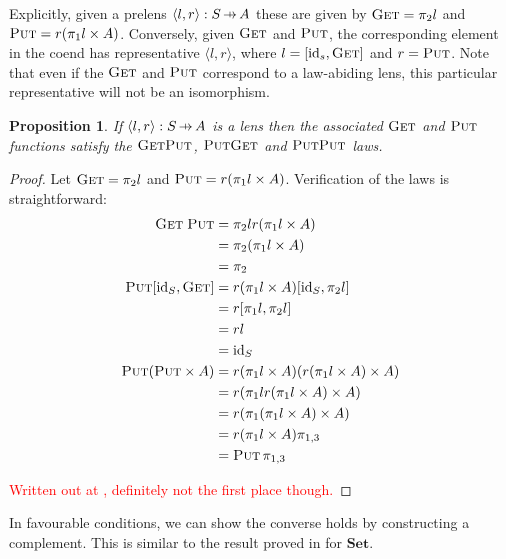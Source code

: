 \documentclass[11pt,a4paper]{article}
\theoremstyle{plain}
\newtheorem{proposition}[theorem]{Proposition}
\theoremstyle{definition}
\newcommand{\Set}{\mathbf{Set}}
\newcommand{\id}{\mathrm{id}}
\newcommand{\fget}{\textsc{Get}}
\newcommand{\fput}{\textsc{Put}}
\newcommand{\hto}{\ensuremath{\,\mathaccent\shortmid\rightarrow\,}}
\newcommand{\todo}[1]{\textcolor{red}{\small #1}}
\begin{document}
Explicitly, given a prelens $\langle l, r \rangle : S \hto A$ these are given by $\fget = \pi_2 l$ and $\fput = r (\pi_1 l \times A)$. Conversely, given $\fget$ and $\fput$, the corresponding element in the coend has representative $\langle l, r \rangle$, where $l = [\id_s, \fget]$ and $r = \fput$. Note that even if the $\fget$ and $\fput$ correspond to a law-abiding lens, this particular representative will not be an isomorphism.

\begin{proposition}
\label{prop-OpticImpliesLensLaws}
If $\langle l, r \rangle : S \hto A$ is a lens then the associated $\fget$ and $\fput$ functions satisfy the $\fget\fput$, $\fput\fget$ and $\fput\fput$ laws.
\end{proposition}
\begin{proof}
Let $\fget = \pi_2 l$ and $\fput = r (\pi_1 l \times A)$. Verification of the laws is straightforward:
\begin{align*}
\fget \; \fput 
&= \pi_2 l r (\pi_1 l \times A) \\
&= \pi_2 (\pi_1 l \times A) \\
&= \pi_2 \\
\fput [\id_S, \fget] 
&= r (\pi_1 l \times A) [\id_S, \pi_2 l] \\
&= r [\pi_1 l, \pi_2 l] \\
&= rl \\
&= \id_S \\
\fput (\fput \times A) 
&= r (\pi_1 l \times A) (r (\pi_1 l \times A) \times A) \\
&= r (\pi_1 l  r (\pi_1 l \times A) \times A) \\
&= r (\pi_1 (\pi_1 l \times A) \times A) \\
&= r (\pi_1 l \times A) \pi_{1,3} \\
&= \fput \, \pi_{1, 3}
\end{align*}

\todo{Written out at \cite{IsomorphismLensesPost}, definitely not the first place though.}
\end{proof}

In favourable conditions, we can show the converse holds by constructing a complement. This is similar to the result proved in \cite[Corollary 13]{AlgebrasAndUpdateStrategies} for $\Set$.
\end{document}
